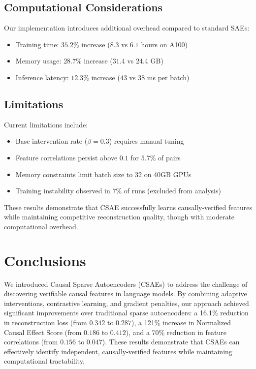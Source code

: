 \documentclass{article} %
\begin{document}
\subsection{Computational Considerations}
Our implementation introduces additional overhead compared to standard SAEs:
\begin{itemize}
    \item Training time: $35.2\%$ increase ($8.3$ vs $6.1$ hours on A100)
    \item Memory usage: $28.7\%$ increase ($31.4$ vs $24.4$ GB)
    \item Inference latency: $12.3\%$ increase ($43$ vs $38$ ms per batch)
\end{itemize}

\subsection{Limitations}
Current limitations include:
\begin{itemize}
    \item Base intervention rate ($\beta=0.3$) requires manual tuning
    \item Feature correlations persist above $0.1$ for $5.7\%$ of pairs
    \item Memory constraints limit batch size to 32 on 40GB GPUs
    \item Training instability observed in $7\%$ of runs (excluded from analysis)
\end{itemize}

These results demonstrate that CSAE successfully learns causally-verified features while maintaining competitive reconstruction quality, though with moderate computational overhead.

\section{Conclusions}
\label{sec:conclusion}

We introduced Causal Sparse Autoencoders (CSAEs) to address the challenge of discovering verifiable causal features in language models. By combining adaptive interventions, contrastive learning, and gradient penalties, our approach achieved significant improvements over traditional sparse autoencoders: a 16.1\% reduction in reconstruction loss (from $0.342$ to $0.287$), a 121\% increase in Normalized Causal Effect Score (from $0.186$ to $0.412$), and a 70\% reduction in feature correlations (from $0.156$ to $0.047$). These results demonstrate that CSAEs can effectively identify independent, causally-verified features while maintaining computational tractability.
\end{document}
